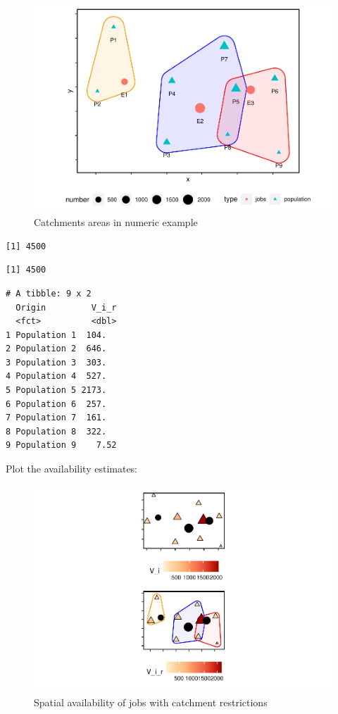 \documentclass[]{elsarticle} %
\begin{document}
\begin{figure}
\includegraphics[width=1\linewidth]{Spatial-Availability_files/figure-latex/toy-example-plot-catchments-1} \caption{\label{fig:toy-example-catchments}Catchments areas in numeric example}\label{fig:toy-example-plot-catchments}
\end{figure}

\begin{verbatim}
[1] 4500
\end{verbatim}

\begin{verbatim}
[1] 4500
\end{verbatim}

\begin{verbatim}
# A tibble: 9 x 2
  Origin         V_i_r
  <fct>          <dbl>
1 Population 1  104.  
2 Population 2  646.  
3 Population 3  303.  
4 Population 4  527.  
5 Population 5 2173.  
6 Population 6  257.  
7 Population 7  161.  
8 Population 8  322.  
9 Population 9    7.52
\end{verbatim}

Plot the availability estimates:

\begin{figure}
\includegraphics[width=1\linewidth]{Spatial-Availability_files/figure-latex/toy-example-availability-with-catchments-1} \caption{\label{fig:toy-example-availability-with-catchments}Spatial availability of jobs with catchment restrictions}\label{fig:toy-example-availability-with-catchments}
\end{figure}
\end{document}
